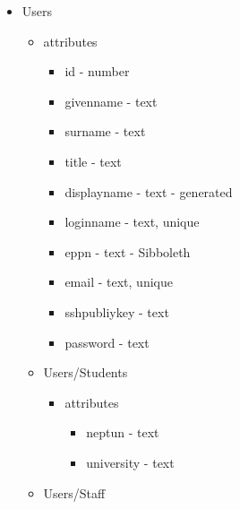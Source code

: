 \begin{itemize}
	\item Users
	\begin{itemize}
		\item attributes
		\begin{itemize}
			\item id - number
			\item givenname - text
			\item surname - text
			\item title - text
			\item displayname - text - generated
			\item loginname - text, unique
			\item eppn - text - Sibboleth
			\item email - text, unique
			\item sshpubliykey - text
			\item password - text
		\end{itemize}
		\item Users/Students
		\begin{itemize}
			\item attributes
			\begin{itemize}
				\item neptun - text
				\item university - text
			\end{itemize}
		\end{itemize}
		\item Users/Staff
	\end{itemize}
\end{itemize}


